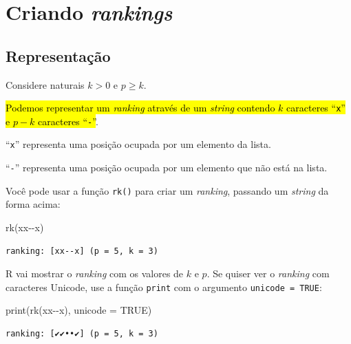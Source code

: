 \documentclass[
  letterpaper,
  DIV=11,
  numbers=noendperiod]{scrreprt}
\newenvironment{Shaded}{\begin{snugshade}}{\end{snugshade}}
\newcommand{\AttributeTok}[1]{\textcolor[rgb]{0.40,0.45,0.13}{#1}}
\newcommand{\ConstantTok}[1]{\textcolor[rgb]{0.56,0.35,0.01}{#1}}
\newcommand{\FunctionTok}[1]{\textcolor[rgb]{0.28,0.35,0.67}{#1}}
\newcommand{\NormalTok}[1]{\textcolor[rgb]{0.00,0.23,0.31}{#1}}
\newcommand{\StringTok}[1]{\textcolor[rgb]{0.13,0.47,0.30}{#1}}
\begin{document}
\section{\texorpdfstring{Criando
\emph{rankings}}{Criando rankings}}\label{criando-rankings}

\subsection{Representação}\label{sec-repr}

Considere naturais $k > 0$ e $p \geq k$.

{\hl{Podemos representar um \emph{ranking} através de um \emph{string}
contendo $k$ caracteres ``{\mbox{\texttt{x}}}'' e $p - k$ caracteres
``{\mbox{\texttt{-}}}''}}.

``\texttt{x}'' representa uma posição ocupada por um elemento da lista.

``\texttt{-}'' representa uma posição ocupada por um elemento que não
está na lista.

Você pode usar a função \texttt{rk()} para criar um \emph{ranking},
passando um \emph{string} da forma acima:

\begin{Shaded}
\begin{Highlighting}[]
\FunctionTok{rk}\NormalTok{(}\StringTok{\textquotesingle{}xx{-}{-}x\textquotesingle{}}\NormalTok{)}
\end{Highlighting}
\end{Shaded}

\begin{verbatim}
ranking: [xx--x] (p = 5, k = 3)
\end{verbatim}

R vai mostrar o \emph{ranking} com os valores de $k$ e $p$. Se quiser
ver o \emph{ranking} com caracteres Unicode, use a função \texttt{print}
com o argumento \texttt{unicode\ =\ TRUE}:

\begin{Shaded}
\begin{Highlighting}[]
\FunctionTok{print}\NormalTok{(}\FunctionTok{rk}\NormalTok{(}\StringTok{\textquotesingle{}xx{-}{-}x\textquotesingle{}}\NormalTok{), }\AttributeTok{unicode =} \ConstantTok{TRUE}\NormalTok{)}
\end{Highlighting}
\end{Shaded}

\begin{verbatim}
ranking: [✔✔••✔] (p = 5, k = 3)
\end{verbatim}
\end{document}
